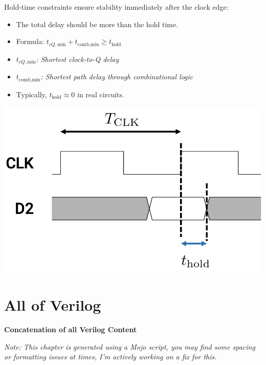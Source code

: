 \documentclass[12pt,openany]{book}
\begin{document}
\begin{center}
    \begin{minipage}{0.5\textwidth}
        Hold-time constraints ensure stability immediately after the clock edge:
        \begin{itemize}
            \item[] The total delay should be more than the hold time.
            \item[] Formula: \( t_{cQ,\text{min}} + t_{\text{comb,min}} \geq t_{\text{hold}} \)
            \item[] \( t_{cQ,\text{min}} \)\textit{: Shortest clock-to-Q delay}            
			\item[] \( t_{\text{comb,min}} \)\textit{: Shortest path delay through combinational logic}
            \item[] Typically, \( t_{\text{hold}} \approx 0 \) in real circuits.
        \end{itemize}
    \end{minipage}
    \hfill
    \begin{minipage}{0.4\textwidth}
        \includegraphics[width=1\textwidth]{circuits/15.1.2_3.png}
    \end{minipage}
\end{center}




\chapter{All of Verilog}
\label{Verilog}\begin{center}\vspace*{1cm}\begin{center}\textbf{Concatenation of all Verilog Content}\end{center} \newline \textit{Note: This chapter is generated using a Mojo script, you may find some spacing or formatting issues at times, I'm actively working on a fix for this.} \end{center}\newpage
\end{document}
